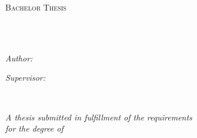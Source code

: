 \documentclass[
11pt, %
english, %
singlespacing, %
headsepline, %
]{MastersDoctoralThesis} %
\author{Edser \textsc{Apperloo}} %
\begin{document}
\frontmatter %

\pagestyle{plain} %


\begin{titlepage}
\begin{center}

\vspace*{.06\textheight}
{\scshape\LARGE \univname\par}\vspace{1.5cm} %
\textsc{\Large Bachelor Thesis}\\[0.5cm] %

\HRule \\[0.4cm] %
{\huge \bfseries \ttitle\par}\vspace{0.4cm} %
\HRule \\[1.5cm] %
 
\begin{minipage}[t]{0.4\textwidth}
\begin{flushleft} \large
\emph{Author:}\\
\textcolor{bordeaux}{\authorname} %
\end{flushleft}
\end{minipage}
\begin{minipage}[t]{0.4\textwidth}
\begin{flushright} \large
\emph{Supervisor:} \\
\textcolor{bordeaux}{\supname} %
\end{flushright}
\end{minipage}\\[3cm]
 
\vfill

\large \textit{A thesis submitted in fulfillment of the requirements\\ for the degree of \degreename}\\[0.3cm] %
\facname\\\groupname\\[2cm] %


\end{center}
\end{titlepage}
\end{document}

